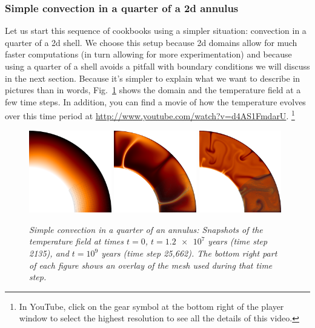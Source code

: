 \documentclass{article}
\begin{document}
\subsubsection{Simple convection in a quarter of a 2d annulus}
\label{sec:shell-simple-2d}

Let us start this sequence of cookbooks using a simpler situation: convection in
a quarter of a 2d shell. We choose this setup because 2d domains allow for much
faster computations (in turn allowing for more experimentation) and because
using a quarter of a shell avoids a pitfall with boundary conditions we will
discuss in the next section. Because it's simpler to explain what we want to
describe in pictures than in words, Fig.~\ref{fig:simple-shell-2d} shows the
domain and the temperature field at a few time steps. In addition, you can find
a movie of how the temperature evolves over this time period at
\url{http://www.youtube.com/watch?v=d4AS1FmdarU}.%
\footnote{In YouTube, click on the gear symbol at the bottom right of the
player window to select the highest resolution to see all the details of this
video.}

\begin{figure}[tb]
\includegraphics[width=0.32\textwidth]{cookbooks/shell_simple_2d/doc/x-movie0000.png}
\hfill
\includegraphics[width=0.32\textwidth]{cookbooks/shell_simple_2d/doc/x-movie0008.png}
\hfill
\includegraphics[width=0.32\textwidth]{cookbooks/shell_simple_2d/doc/x-movie1000.png}
\caption{\it Simple convection in a quarter of an annulus: Snapshots of the
temperature field at times $t=0$, $t=\num{1.2e7}$ years (time step 2135), and
$t=10^9$ years (time step 25,662). The bottom right part of each figure shows an
overlay of the mesh used during that time step.}
\label{fig:simple-shell-2d}
\end{figure}
\end{document}
